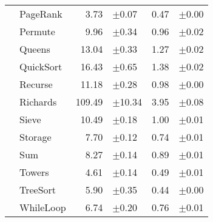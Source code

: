 \begin{tabular}{llrlrl}
 & PageRank & 3.73 & \scriptsize\textcolor{gray!60}{$\pm$0.07} & 0.47 & \scriptsize\textcolor{gray!60}{$\pm$0.00} \\
 & Permute & 9.96 & \scriptsize\textcolor{gray!60}{$\pm$0.34} & 0.96 & \scriptsize\textcolor{gray!60}{$\pm$0.02} \\
 & Queens & 13.04 & \scriptsize\textcolor{gray!60}{$\pm$0.33} & 1.27 & \scriptsize\textcolor{gray!60}{$\pm$0.02} \\
 & QuickSort & 16.43 & \scriptsize\textcolor{gray!60}{$\pm$0.65} & 1.38 & \scriptsize\textcolor{gray!60}{$\pm$0.02} \\
 & Recurse & 11.18 & \scriptsize\textcolor{gray!60}{$\pm$0.28} & 0.98 & \scriptsize\textcolor{gray!60}{$\pm$0.00} \\
 & Richards & 109.49 & \scriptsize\textcolor{gray!60}{$\pm$10.34} & 3.95 & \scriptsize\textcolor{gray!60}{$\pm$0.08} \\
 & Sieve & 10.49 & \scriptsize\textcolor{gray!60}{$\pm$0.18} & 1.00 & \scriptsize\textcolor{gray!60}{$\pm$0.01} \\
 & Storage & 7.70 & \scriptsize\textcolor{gray!60}{$\pm$0.12} & 0.74 & \scriptsize\textcolor{gray!60}{$\pm$0.01} \\
 & Sum & 8.27 & \scriptsize\textcolor{gray!60}{$\pm$0.14} & 0.89 & \scriptsize\textcolor{gray!60}{$\pm$0.01} \\
 & Towers & 4.61 & \scriptsize\textcolor{gray!60}{$\pm$0.14} & 0.49 & \scriptsize\textcolor{gray!60}{$\pm$0.01} \\
 & TreeSort & 5.90 & \scriptsize\textcolor{gray!60}{$\pm$0.35} & 0.44 & \scriptsize\textcolor{gray!60}{$\pm$0.00} \\
 & WhileLoop & 6.74 & \scriptsize\textcolor{gray!60}{$\pm$0.20} & 0.76 & \scriptsize\textcolor{gray!60}{$\pm$0.01} \\
\bottomrule
\end{tabular}
